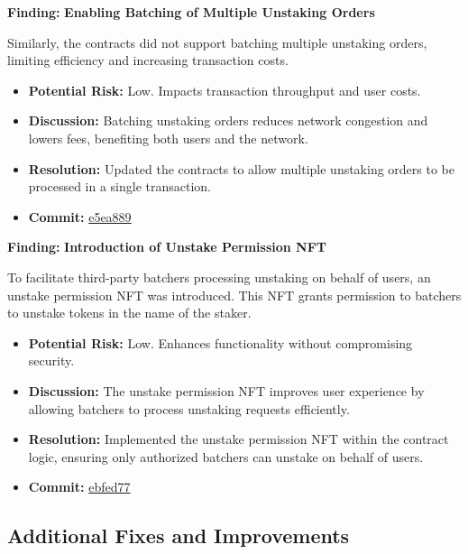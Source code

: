 \documentclass{article}
\begin{document}
\begin{minorbox}
\textbf{Finding:} \textbf{Enabling Batching of Multiple Unstaking Orders}

Similarly, the contracts did not support batching multiple unstaking orders, limiting efficiency and increasing transaction costs.

\begin{itemize}[label=$\diamond$]
    \item \textbf{Potential Risk:} Low. Impacts transaction throughput and user costs.
    \item \textbf{Discussion:} Batching unstaking orders reduces network congestion and lowers fees, benefiting both users and the network.
    \item \textbf{Resolution:} Updated the contracts to allow multiple unstaking orders to be processed in a single transaction.
    \item \textbf{Commit:} \href{https://github.com/MuesliSwapLabs/muesliswap-onchain-staking/commit/e5ea889fe523e28f37e7dac1190429bf596cf1db}{e5ea889}
\end{itemize}
\end{minorbox}

\begin{minorbox}
\textbf{Finding:} \textbf{Introduction of Unstake Permission NFT}

To facilitate third-party batchers processing unstaking on behalf of users, an unstake permission NFT was introduced. This NFT grants permission to batchers to unstake tokens in the name of the staker.

\begin{itemize}[label=$\diamond$]
    \item \textbf{Potential Risk:} Low. Enhances functionality without compromising security.
    \item \textbf{Discussion:} The unstake permission NFT improves user experience by allowing batchers to process unstaking requests efficiently.
    \item \textbf{Resolution:} Implemented the unstake permission NFT within the contract logic, ensuring only authorized batchers can unstake on behalf of users.
    \item \textbf{Commit:} \href{https://github.com/MuesliSwapLabs/muesliswap-onchain-staking/commit/ebfed77e73e640bbe8de5c9f83a8327a0e0f0379}{ebfed77}
\end{itemize}
\end{minorbox}

\subsection{Additional Fixes and Improvements}
\end{document}
